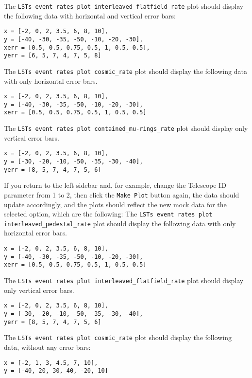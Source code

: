 The \texttt{LSTs event rates plot interleaved\_flatfield\_rate} plot should display the following data with horizontal and vertical error bars:
\begin{verbatim}
x = [-2, 0, 2, 3.5, 6, 8, 10],
y = [-40, -30, -35, -50, -10, -20, -30],
xerr = [0.5, 0.5, 0.75, 0.5, 1, 0.5, 0.5],
yerr = [6, 5, 7, 4, 7, 5, 8]
\end{verbatim}

The \texttt{LSTs event rates plot cosmic\_rate} plot should display the following data with only horizontal error bars.
\begin{verbatim}
x = [-2, 0, 2, 3.5, 6, 8, 10],
y = [-40, -30, -35, -50, -10, -20, -30],
xerr = [0.5, 0.5, 0.75, 0.5, 1, 0.5, 0.5]
\end{verbatim}

The \texttt{LSTs event rates plot contained\_mu-rings\_rate} plot should display only vertical error bars.
\begin{verbatim}
x = [-2, 0, 2, 3.5, 6, 8, 10],
y = [-30, -20, -10, -50, -35, -30, -40],
yerr = [8, 5, 7, 4, 7, 5, 6]
\end{verbatim}

If you return to the left sidebar and, for example, change the Telescope ID parameter from 1 to 2, then click the \texttt{Make Plot} button again, the data should update accordingly, and the plots should reflect the new mock data for the selected option, which are the following:
The \texttt{LSTs event rates plot interleaved\_pedestal\_rate} plot should display the following data with only horizontal error bars.
\begin{verbatim}
x = [-2, 0, 2, 3.5, 6, 8, 10],
y = [-40, -30, -35, -50, -10, -20, -30],
xerr = [0.5, 0.5, 0.75, 0.5, 1, 0.5, 0.5]
\end{verbatim}

The \texttt{LSTs event rates plot interleaved\_flatfield\_rate} plot should display only vertical error bars.
\begin{verbatim}
x = [-2, 0, 2, 3.5, 6, 8, 10],
y = [-30, -20, -10, -50, -35, -30, -40],
yerr = [8, 5, 7, 4, 7, 5, 6]
\end{verbatim}

The \texttt{LSTs event rates plot cosmic\_rate} plot should display the following data, without any error bars:
\begin{verbatim}
x = [-2, 1, 3, 4.5, 7, 10],
y = [-40, 20, 30, 40, -20, 10]
\end{verbatim}

